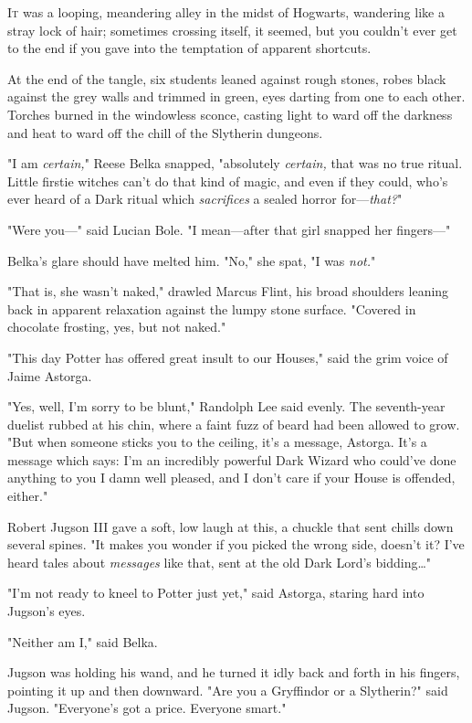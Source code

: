 
\lettrine{I}{t} was a looping,
meandering alley in the midst of Hogwarts, wandering like a stray lock of hair;
sometimes crossing itself, it seemed, but you couldn't ever get to the end if
you gave into the temptation of apparent shortcuts.

At the end of the tangle, six students leaned against rough stones, robes black
against the grey walls and trimmed in green, eyes darting from one to each
other. Torches burned in the windowless sconce, casting light to ward off the
darkness and heat to ward off the chill of the Slytherin dungeons.

"I am \emph{certain,}" Reese Belka snapped, "absolutely \emph{certain,} that
was no true ritual. Little firstie witches can't do that kind of magic, and
even if they could, who's ever heard of a Dark ritual which \emph{sacrifices} a
sealed horror for---\emph{that?}"

"Were you---" said Lucian Bole. "I mean---after that girl snapped her
fingers---"

Belka's glare should have melted him. "No," she spat, "I was \emph{not.}"

"That is, she wasn't naked," drawled Marcus Flint, his broad shoulders leaning
back in apparent relaxation against the lumpy stone surface. "Covered in
chocolate frosting, yes, but not naked."

"This day Potter has offered great insult to our Houses," said the grim voice
of Jaime Astorga.

"Yes, well, I'm sorry to be blunt," Randolph Lee said evenly. The seventh-year
duelist rubbed at his chin, where a faint fuzz of beard had been allowed to
grow. "But when someone sticks you to the ceiling, it's a message, Astorga.
It's a message which says: I'm an incredibly powerful Dark Wizard who could've
done anything to you I damn well pleased, and I don't care if your House is
offended, either."

Robert Jugson III gave a soft, low laugh at this, a chuckle that sent chills
down several spines. "It makes you wonder if you picked the wrong side, doesn't
it? I've heard tales about \emph{messages} like that, sent at the old Dark
Lord's bidding{\ldots}"

"I'm not ready to kneel to Potter just yet," said Astorga, staring hard into
Jugson's eyes.

"Neither am I," said Belka.

Jugson was holding his wand, and he turned it idly back and forth in his
fingers, pointing it up and then downward. "Are you a Gryffindor or a
Slytherin?" said Jugson. "Everyone's got a price. Everyone smart."

